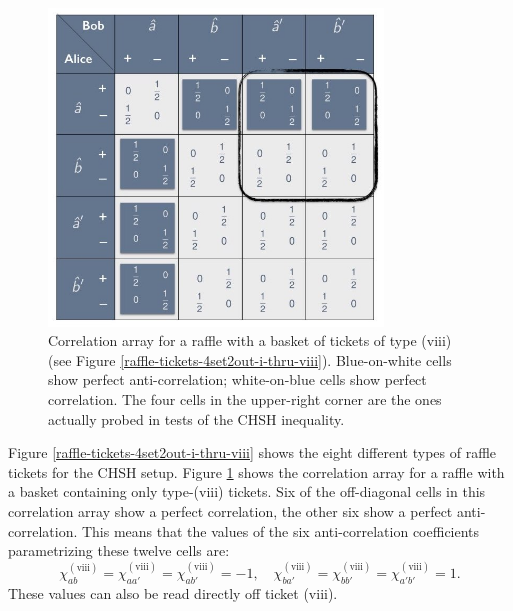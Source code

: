 \begin{figure}[h]
 \centering
   \includegraphics[width=3.5in]{CA-4set2out-raffle-viii.jpeg} 
   \caption{Correlation array for a raffle with a basket of tickets of type (viii) (see Figure \ref{raffle-tickets-4set2out-i-thru-viii}). Blue-on-white cells show perfect anti-correlation; white-on-blue cells show perfect correlation. The four cells in the upper-right corner are the ones actually probed in tests of the CHSH inequality.}
   \label{CA-4set2out-raffle-viii}
\end{figure}

Figure \ref{raffle-tickets-4set2out-i-thru-viii} shows the eight different types of raffle tickets for the CHSH setup. Figure \ref{CA-4set2out-raffle-viii} shows the correlation array for a raffle with a basket containing only type-(viii) tickets. Six of the off-diagonal cells in this correlation array show a perfect correlation, the other six show a perfect anti-correlation. This means that the values of the six anti-correlation coefficients parametrizing these twelve cells are:
\begin{equation}
\chi_{ab}^{\mathrm{(viii)}} = \chi_{aa'}^{\mathrm{(viii)}} = \chi_{ab'}^{\mathrm{(viii)}} = -1, \quad \chi_{ba'}^{\mathrm{(viii)}} = \chi_{bb'}^{\mathrm{(viii)}} = \chi_{a'b'}^{\mathrm{(viii)}} = 1.
\label{chi values for ticket (viii)}
\end{equation}
These values can also be read directly off ticket (viii).  

